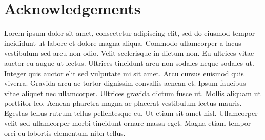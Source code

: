 \chapter*{Acknowledgements}

Lorem ipsum dolor sit amet, consectetur adipiscing elit, sed do eiusmod tempor incididunt ut labore et dolore magna aliqua. Commodo ullamcorper a lacus vestibulum sed arcu non odio. Velit scelerisque in dictum non. Eu ultrices vitae auctor eu augue ut lectus. Ultrices tincidunt arcu non sodales neque sodales ut. Integer quis auctor elit sed vulputate mi sit amet. Arcu cursus euismod quis viverra. Gravida arcu ac tortor dignissim convallis aenean et. Ipsum faucibus vitae aliquet nec ullamcorper. Ultrices gravida dictum fusce ut. Mollis aliquam ut porttitor leo. Aenean pharetra magna ac placerat vestibulum lectus mauris. Egestas tellus rutrum tellus pellentesque eu. Ut etiam sit amet nisl. Ullamcorper velit sed ullamcorper morbi tincidunt ornare massa eget. Magna etiam tempor orci eu lobortis elementum nibh tellus.
